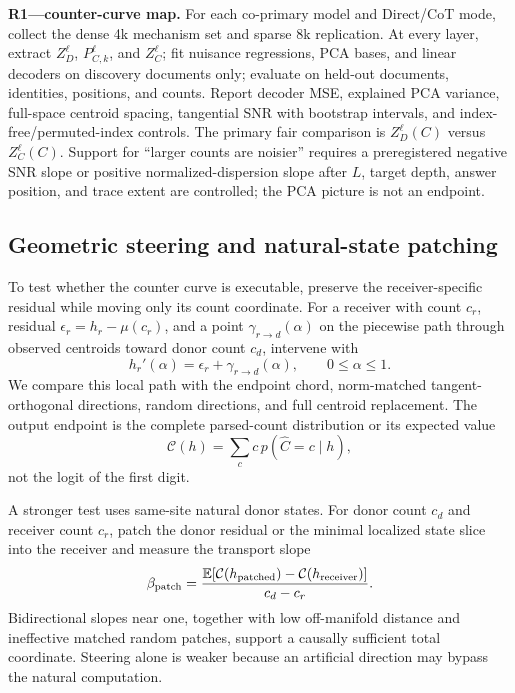 \begin{todobox}
\textbf{R1---counter-curve map.}
For each co-primary model and Direct/CoT mode, collect the dense 4k mechanism set and sparse 8k replication. At every layer, extract \(Z_D^\ell\), \(P_{C,k}^\ell\), and \(Z_C^\ell\); fit nuisance regressions, PCA bases, and linear decoders on discovery documents only; evaluate on held-out documents, identities, positions, and counts. Report decoder MSE, explained PCA variance, full-space centroid spacing, tangential SNR with bootstrap intervals, and index-free/permuted-index controls. The primary fair comparison is \(Z_D^\ell(C)\) versus \(Z_C^\ell(C)\). Support for ``larger counts are noisier'' requires a preregistered negative SNR slope or positive normalized-dispersion slope after \(L\), target depth, answer position, and trace extent are controlled; the PCA picture is not an endpoint.
\end{todobox}

\subsection{Geometric steering and natural-state patching}

To test whether the counter curve is executable, preserve the receiver-specific residual while moving only its count coordinate. For a receiver with count \(c_r\), residual \(\epsilon_r=h_r-\mu(c_r)\), and a point \(\gamma_{r\rightarrow d}(\alpha)\) on the piecewise path through observed centroids toward donor count \(c_d\), intervene with
\begin{equation}
h_r'(\alpha)=\epsilon_r+\gamma_{r\rightarrow d}(\alpha),
\qquad 0\leq\alpha\leq1.
\label{eq:path-steering}
\end{equation}
We compare this local path with the endpoint chord, norm-matched tangent-orthogonal directions, random directions, and full centroid replacement. The output endpoint is the complete parsed-count distribution or its expected value
\[
\mathcal C(h)=\sum_c c\,p(\widehat C=c\mid h),
\]
not the logit of the first digit.

A stronger test uses same-site natural donor states. For donor count \(c_d\) and receiver count \(c_r\), patch the donor residual or the minimal localized state slice into the receiver and measure the transport slope
\begin{equation}
\beta_{\rm patch}
=
\frac{\mathbb{E}[\mathcal C(h_{\rm patched})-\mathcal C(h_{\rm receiver})]}
{c_d-c_r}.
\label{eq:patch-slope}
\end{equation}
Bidirectional slopes near one, together with low off-manifold distance and ineffective matched random patches, support a causally sufficient total coordinate. Steering alone is weaker because an artificial direction may bypass the natural computation.

